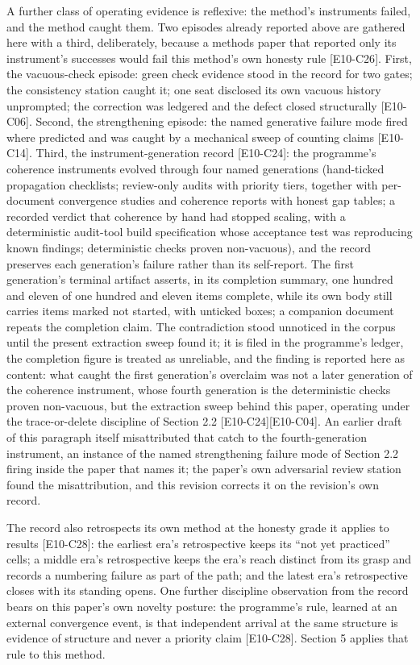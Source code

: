 \documentclass[
  11pt,
]{article}
\begin{document}
A further class of operating evidence is reflexive: the method's
instruments failed, and the method caught them. Two episodes already
reported above are gathered here with a third, deliberately, because a
methods paper that reported only its instrument's successes would fail
this method's own honesty rule {[}E10-C26{]}. First, the vacuous-check
episode: green check evidence stood in the record for two gates; the
consistency station caught it; one seat disclosed its own vacuous
history unprompted; the correction was ledgered and the defect closed
structurally {[}E10-C06{]}. Second, the strengthening episode: the named
generative failure mode fired where predicted and was caught by a
mechanical sweep of counting claims {[}E10-C14{]}. Third, the
instrument-generation record {[}E10-C24{]}: the programme's coherence
instruments evolved through four named generations (hand-ticked
propagation checklists; review-only audits with priority tiers, together
with per-document convergence studies and coherence reports with honest
gap tables; a recorded verdict that coherence by hand had stopped
scaling, with a deterministic audit-tool build specification whose
acceptance test was reproducing known findings; deterministic checks
proven non-vacuous), and the record preserves each generation's failure
rather than its self-report. The first generation's terminal artifact
asserts, in its completion summary, one hundred and eleven of one
hundred and eleven items complete, while its own body still carries
items marked not started, with unticked boxes; a companion document
repeats the completion claim. The contradiction stood unnoticed in the
corpus until the present extraction sweep found it; it is filed in the
programme's ledger, the completion figure is treated as unreliable, and
the finding is reported here as content: what caught the first
generation's overclaim was not a later generation of the coherence
instrument, whose fourth generation is the deterministic checks proven
non-vacuous, but the extraction sweep behind this paper, operating under
the trace-or-delete discipline of Section 2.2
{[}E10-C24{]}{[}E10-C04{]}. An earlier draft of this paragraph itself
misattributed that catch to the fourth-generation instrument, an
instance of the named strengthening failure mode of Section 2.2 firing
inside the paper that names it; the paper's own adversarial review
station found the misattribution, and this revision corrects it on the
revision's own record.

The record also retrospects its own method at the honesty grade it
applies to results {[}E10-C28{]}: the earliest era's retrospective keeps
its ``not yet practiced'' cells; a middle era's retrospective keeps the
era's reach distinct from its grasp and records a numbering failure as
part of the path; and the latest era's retrospective closes with its
standing opens. One further discipline observation from the record bears
on this paper's own novelty posture: the programme's rule, learned at an
external convergence event, is that independent arrival at the same
structure is evidence of structure and never a priority claim
{[}E10-C28{]}. Section 5 applies that rule to this method.
\end{document}
